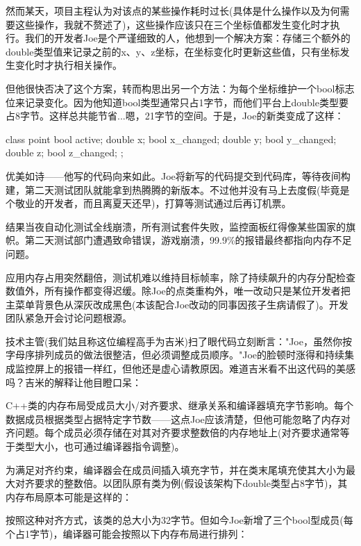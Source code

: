 然而某天，项目主程认为对该点的某些操作耗时过长(具体是什么操作以及为何需要这些操作，我就不赘述了)，这些操作应该只在三个坐标值都发生变化时才执行。我们的开发者Joe是个严谨细致的人，他想到一个解决方案：存储三个额外的double类型值来记录之前的x、y、z坐标，在坐标变化时更新这些值，只有坐标发生变化时才执行相关操作。

但他很快否决了这个方案，转而构思出另一个方法：为每个坐标维护一个bool标志位来记录变化。因为他知道bool类型通常只占1字节，而他们平台上double类型要占8字节。这样总共能节省...嗯，21字节的空间。于是，Joe的新类变成了这样：

\begin{cpp}
class point {
  bool active;
  double x;
  bool x_changed;
  double y;
  bool y_changed;
  double z;
  bool z_changed;
};
\end{cpp}

优美如诗——他写的代码向来如此。Joe将新写的代码提交到代码库，等待夜间构建，第二天测试团队就能拿到热腾腾的新版本。不过他并没有马上去度假(毕竟是个敬业的开发者，而且离夏天还早)，打算等测试通过后再订机票。

结果当夜自动化测试全线崩溃，所有测试套件失败，监控面板红得像某些国家的旗帜。第二天测试部门遭遇致命错误，游戏崩溃，99.9\%的报错最终都指向内存不足问题。

应用内存占用突然翻倍，测试机难以维持目标帧率，除了持续飙升的内存分配检查数值外，所有操作都变得迟缓。除Joe的点类重构外，唯一改动只是某位开发者把主菜单背景色从深灰改成黑色(本该配合Joe改动的同事因孩子生病请假了)。开发团队紧急开会讨论问题根源。

技术主管(我们姑且称这位编程高手为吉米)扫了眼代码立刻断言："Joe，虽然你按字母序排列成员的做法很整洁，但必须调整成员顺序。"Joe的脸顿时涨得和持续集成监控屏上的报错一样红，但他还是虚心请教原因。难道吉米看不出这代码的美感吗？吉米的解释让他目瞪口呆：

C++类的内存布局受成员大小/对齐要求、继承关系和编译器填充字节影响。每个数据成员根据类型占据特定字节数——这点Joe应该清楚，但他可能忽略了内存对齐问题。每个成员必须存储在对其对齐要求整数倍的内存地址上(对齐要求通常等于类型大小，也可通过编译器指令调整)。

为满足对齐约束，编译器会在成员间插入填充字节，并在类末尾填充使其大小为最大对齐要求的整数倍。以团队原有类为例(假设该架构下double类型占8字节)，其内存布局原本可能是这样的：


按照这种对齐方式，该类的总大小为32字节。但如今Joe新增了三个bool型成员(每个占1字节)，编译器可能会按照以下内存布局进行排列：

